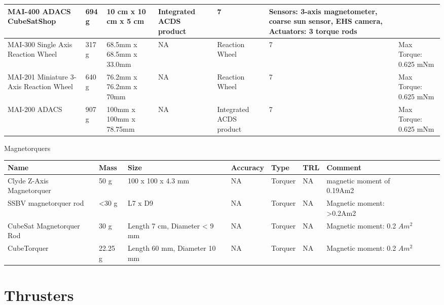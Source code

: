 \documentclass[english]{article}
\begin{document}
\begin{center}
\begin{tabular}{ | p{2cm} | p{1.25cm} | p{2cm} | l | l | l | p{2cm} |}
	   MAI-400 ADACS CubeSatShop \cite{CubeShop} & 694 g & 10 cm x 10 cm x 5 cm	& Integrated ACDS product & 7 & Sensors: 3-axis magnetometer, coarse sun sensor, EHS camera, Actuators: 3 torque rods \\ \hline
	   
	   MAI-300 Single Axis Reaction Wheel \cite{CubeShop} & 317 g & 68.5mm x 68.5mm x 33.0mm & NA & Reaction Wheel & 7 & Max Torque: 0.625 mNm \\ \hline
	   
	   MAI-201 Miniature 3-Axis Reaction Wheel \cite{CubeShop} & 640 g & 76.2mm x 76.2mm x 70mm & NA & Reaction Wheel & 7 & Max Torque: 0.625 mNm \\ \hline
	   
	   MAI-200 ADACS \cite{CubeShop} & 907 g & 100mm x 100mm x 78.75mm & NA & Integrated ACDS product & 7 & Max Torque: 0.625 mNm \\ \hline
     \end{tabular}
\end{center}

Magnetorquers\\

\begin{center}
     \begin{tabular}{ |p{2cm} | p{1cm} | p{1cm} |  p{1cm} | l | p{2cm} | l | p{4cm} | p{1cm} | p{3cm} |  }
     \hline

      {\bf Name} & {\bf Mass} & {\bf Size} & {\bf Accuracy} & {\bf Type} & {\bf TRL} & {\bf Comment}  \\ \hline
      
       Clyde Z-Axis Magnetorquer & 50 g & 100 x 100 x 4.3 mm & NA & Torquer & NA & magnetic moment of 0.19Am2 \\ \hline
       
	   SSBV magnetorquer rod & <30 g & L7 x D9 & NA & Torquer & NA & Magnetic moment: >0.2Am2 \\ \hline
	   
	   CubeSat Magnetorquer Rod \cite{CubeShop} & 30 g & Length 7 cm, Diameter < 9 mm & NA & Torquer & NA & Magnetic moment: 0.2 $Am^2$ \\ \hline
	   
	   CubeTorquer \cite{CubeShop} & 22.25 g & Length 60 mm, Diameter 10 mm & NA & Torquer & NA & Magnetic moment: 0.2 $Am^2$ \\ \hline
     \end{tabular}
\end{center}

\section{Thrusters}
\end{document}
